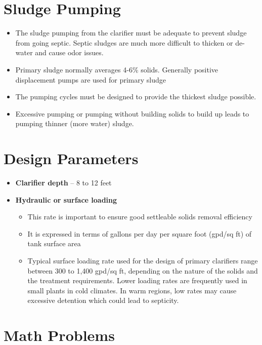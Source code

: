 \section{Sludge Pumping}

	\begin{itemize}
		\item The sludge pumping from the clarifier must be adequate 			to prevent sludge from going septic. Septic sludges are much 			more difficult to thicken or de-water and cause odor issues. 
		\item Primary sludge normally averages 4-6\% solids. 
		Generally positive displacement pumps are used for primary 				sludge
		\item The pumping cycles must be designed to provide the 				thickest sludge possible.
		\item Excessive pumping or pumping without building solids to 			build up leads to pumping thinner (more water) sludge.
	\end{itemize}
\section{Design Parameters}
	\begin{itemize}
	\setlength\itemsep{1em}
		\item \textbf{Clarifier depth} – 8 to 12 feet
		\item \textbf{Hydraulic or surface loading}
			\begin{itemize}
			\item This rate is important to ensure good settleable 					solids removal efficiency
			\item It is expressed in terms of gallons per day per 					square foot (gpd/sq ft) of tank surface area
			\item Typical surface loading rate used for the design of 				primary clarifiers range between 300 to 1,400 gpd/sq ft, 				depending on the nature of the solids and the treatment 				requirements. Lower loading rates are frequently used in 				small plants in cold climates. In warm regions, low rates 				may cause excessive detention which could lead to 						septicity.
			\end{itemize}
	\end{itemize}
\section{Math Problems}

